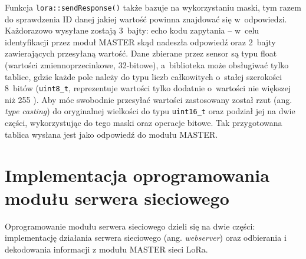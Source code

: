 \FloatBarrier
Funkcja \texttt{lora::sendResponse()} także bazuje na wykorzystaniu maski, tym razem do sprawdzenia ID danej jakiej
wartość powinna znajdować się w~odpowiedzi. Każdorazowo wysyłane zostają 3~bajty: echo kodu zapytania -- w~celu
identyfikacji przez moduł MASTER skąd nadeszła odpowiedź oraz 2~bajty zawierających przesyłaną wartość. Dane zbierane
przez sensor są typu float (wartości zmiennoprzecinkowe, 32-bitowe), a~biblioteka może obsługiwać tylko tablice, gdzie
każde pole należy do typu liczb całkowitych o~stałej szerokości 8~bitów (\texttt{uint8\_t}, reprezentuje wartości tylko
dodatnie o~wartości nie większej niż 255 \cite{cpp-fwinteger}). Aby móc swobodnie przesyłać wartości zastosowany został
rzut (ang. \textsl{type casting}) do oryginalnej wielkości do typu \texttt{uint16\_t} oraz podział jej na dwie części,
wykorzystując do tego maski oraz operacje bitowe. Tak przygotowana tablica wysłana jest jako odpowiedź do modułu MASTER.

\FloatBarrier
\section{Implementacja oprogramowania modułu serwera sieciowego\label{sect:firmware-webserver}} Oprogramowanie modułu
serwera sieciowego dzieli się na dwie części: implementację działania serwera sieciowego (ang. \textsl{webserver}) oraz
odbierania i dekodowania informacji z modułu MASTER sieci LoRa.